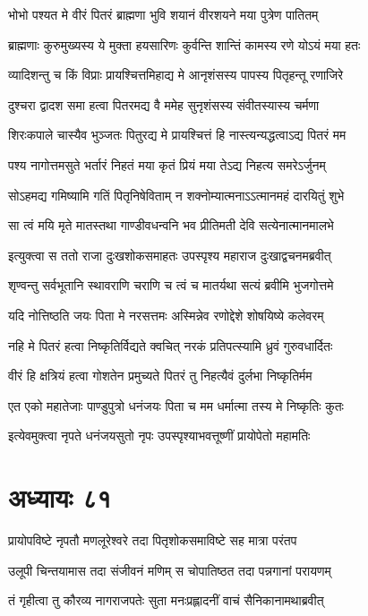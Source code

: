 \twolineshloka
{भोभो पश्यत मे वीरं पितरं ब्राह्मणा भुवि}
{शयानं वीरशयने मया पुत्रेण पातितम्}


\twolineshloka
{ब्राह्मणाः कुरुमुख्यस्य ये मुक्ता हयसारिणः}
{कुर्वन्ति शान्तिं कामस्य रणे योऽयं मया हतः}


\twolineshloka
{व्यादिशन्तु च किं विप्राः प्रायश्चित्तमिहाद्य मे}
{आनृशंसस्य पापस्य पितृहन्तू रणाजिरे}


\twolineshloka
{दुश्चरा द्वादश समा हत्वा पितरमद्य वै}
{ममेह सुनृशंसस्य संवीतस्यास्य चर्मणा}


\twolineshloka
{शिरःकपाले चास्यैव भुञ्जतः पितुरद्य मे}
{प्रायश्चित्तं हि नास्त्यन्यद्धत्वाऽद्य पितरं मम}


\twolineshloka
{पश्य नागोत्तमसुते भर्तारं निहतं मया}
{कृतं प्रियं मया तेऽद्य निहत्य समरेऽर्जुनम्}


\twolineshloka
{सोऽहमद्य गमिष्यामि गतिं पितृनिषेविताम्}
{न शक्नोम्यात्मनाऽऽत्मानमहं दारयितुं शुभे}


\twolineshloka
{सा त्वं मयि मृते मातस्तथा गाण्डीवधन्वनि}
{भव प्रीतिमती देवि सत्येनात्मानमालभे}


\twolineshloka
{इत्युक्त्वा स ततो राजा दुःखशोकसमाहतः}
{उपस्पृश्य महाराज दुःखाद्वचनमब्रवीत्}


\twolineshloka
{शृण्वन्तु सर्वभूतानि स्थावराणि चराणि च}
{त्वं च मातर्यथा सत्यं ब्रवीमि भुजगोत्तमे}


\twolineshloka
{यदि नोत्तिष्ठति जयः पिता मे नरसत्तमः}
{अस्मिन्नेव रणोद्देशे शोषयिष्ये कलेवरम्}


\twolineshloka
{नहि मे पितरं हत्वा निष्कृतिर्विद्यते क्वचित्}
{नरकं प्रतिपत्स्यामि ध्रुवं गुरुवधार्दितः}


\twolineshloka
{वीरं हि क्षत्रियं हत्वा गोशतेन प्रमुच्यते}
{पितरं तु निहत्यैवं दुर्लभा निष्कृतिर्मम}


\twolineshloka
{एत एको महातेजाः पाण्डुपुत्रो धनंजयः}
{पिता च मम धर्मात्मा तस्य मे निष्कृतिः कुतः}


\twolineshloka
{इत्येवमुक्त्वा नृपते धनंजयसुतो नृपः}
{उपस्पृश्याभवत्तूष्णीं प्रायोपेतो महामतिः}


\chapter{अध्यायः ८१}
\twolineshloka
{प्रायोपविष्टे नृपतौ मणलूरेश्वरे तदा}
{पितृशोकसमाविष्टे सह मात्रा परंतप}


\twolineshloka
{उलूपी चिन्तयामास तदा संजीवनं मणिम्}
{स चोपातिष्ठत तदा पन्नगानां परायणम्}


\twolineshloka
{तं गृहीत्वा तु कौरव्य नागराजपतेः सुता}
{मनःप्रह्लादनीं वाचं सैनिकानामथाब्रवीत्}


